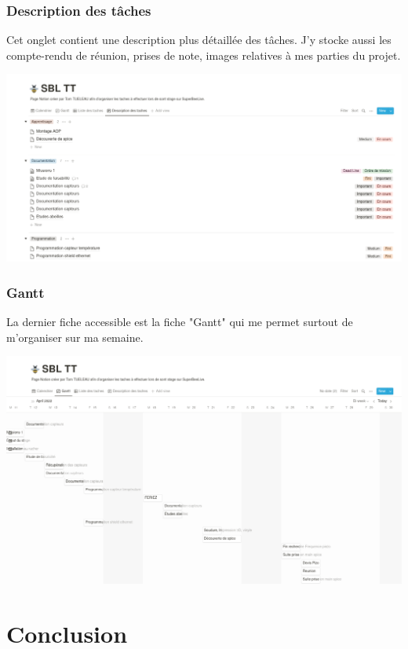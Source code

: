 \documentclass[11pt,french,a4paper]{article}
\begin{document}
\subsubsection{Description des tâches}
Cet onglet contient une description plus détaillée des tâches. J'y stocke aussi les compte-rendu de réunion, prises de note, images relatives à mes parties du projet.
\begin{center}	
\includegraphics[scale=0.35]{../img/notiondescriptiondestaches.png}
\label{Description des taches}
\end{center}

\subsubsection{Gantt}
La dernier fiche accessible est la fiche "Gantt" qui me permet surtout de m'organiser sur ma semaine. 
\begin{center}	
\includegraphics[scale=0.35]{../img/notiongantt.png}
\label{Gantt}
\end{center}
\newpage 
\section{Conclusion}
\end{document}
